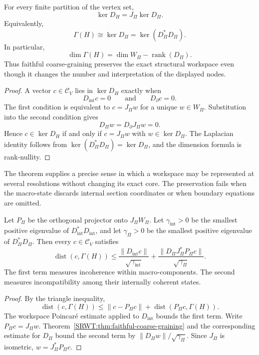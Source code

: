 \begin{SRWTtheorem}\label{SRWT:thm:faithful-coarse-graining}
For every finite partition of the vertex set,
\[
\boxed{
\ker D_H
=
J_\Pi\ker D_\Pi.
}
\]
Equivalently,
\[
\boxed{
\Gamma(H)
\cong
\ker D_\Pi
=
\ker(D_\Pi^*D_\Pi).
}
\]
In particular,
\[
\dim\Gamma(H)
=
\dim W_\Pi-\operatorname{rank}(D_\Pi).
\]
Thus faithful coarse-graining preserves the exact structural workspace even
though it changes the number and interpretation of the displayed nodes.
\end{SRWTtheorem}

\begin{proof}
A vector \(c\in\mathcal C_V\) lies in \(\ker D_H\) exactly when
\[
D_{\mathrm{int}}c=0
\qquad\text{and}\qquad
D_{\partial}c=0.
\]
The first condition is equivalent to \(c=J_\Pi w\) for a unique
\(w\in W_\Pi\). Substitution into the second condition gives
\[
D_\Pi w
=
D_{\partial}J_\Pi w
=0.
\]
Hence \(c\in\ker D_H\) if and only if
\(c=J_\Pi w\) with \(w\in\ker D_\Pi\). The Laplacian identity follows from
\(\ker(D_\Pi^*D_\Pi)=\ker D_\Pi\), and the dimension formula is rank-nullity.
\end{proof}

The theorem supplies a precise sense in which a workspace may be represented
at several resolutions without changing its exact core. The preservation
fails when the macro-state discards internal section coordinates or when
boundary equations are omitted.

\begin{SRWTcorollary}\label{SRWT:cor:two-scale-decomposition}
Let \(P_\Pi\) be the orthogonal projector onto \(J_\Pi W_\Pi\). Let
\(\gamma_{\mathrm{int}}>0\) be the smallest positive eigenvalue of
\(D_{\mathrm{int}}^*D_{\mathrm{int}}\), and let
\(\gamma_\Pi>0\) be the smallest positive eigenvalue of
\(D_\Pi^*D_\Pi\). Then every \(c\in\mathcal C_V\) satisfies
\[
\boxed{
\operatorname{dist}(c,\Gamma(H))
\leq
\frac{\|D_{\mathrm{int}}c\|}{\sqrt{\gamma_{\mathrm{int}}}}
+
\frac{
\|D_\Pi J_\Pi^*P_\Pi c\|
}{\sqrt{\gamma_\Pi}}.
}
\]
The first term measures incoherence within macro-components. The second
measures incompatibility among their internally coherent states.
\end{SRWTcorollary}

\begin{proof}
By the triangle inequality,
\[
\operatorname{dist}(c,\Gamma(H))
\leq
\|c-P_\Pi c\|
+
\operatorname{dist}(P_\Pi c,\Gamma(H)).
\]
The workspace Poincar\'e estimate applied to \(D_{\mathrm{int}}\) bounds the
first term. Write \(P_\Pi c=J_\Pi w\). Theorem~\ref{SRWT:thm:faithful-coarse-graining}
and the corresponding estimate for \(D_\Pi\) bound the second term by
\(\|D_\Pi w\|/\sqrt{\gamma_\Pi}\). Since \(J_\Pi\) is isometric,
\(w=J_\Pi^*P_\Pi c\).
\end{proof}

